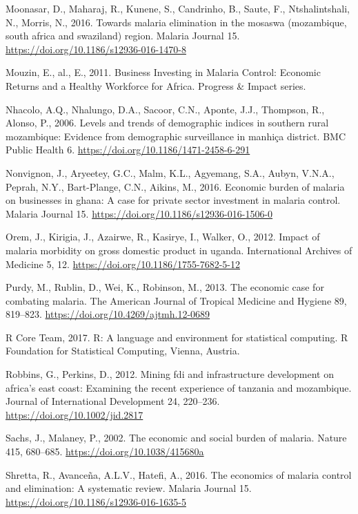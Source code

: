 \documentclass[]{article}
\begin{document}
\hypertarget{ref-Moonasar_2016}{}
Moonasar, D., Maharaj, R., Kunene, S., Candrinho, B., Saute, F.,
Ntshalintshali, N., Morris, N., 2016. Towards malaria elimination in the
mosaswa (mozambique, south africa and swaziland) region. Malaria Journal
15. \url{https://doi.org/10.1186/s12936-016-1470-8}

\hypertarget{ref-Mouzin2011}{}
Mouzin, E., al., E., 2011. Business Investing in Malaria Control:
Economic Returns and a Healthy Workforce for Africa. Progress \& Impact
series.

\hypertarget{ref-Nhacolo_2006}{}
Nhacolo, A.Q., Nhalungo, D.A., Sacoor, C.N., Aponte, J.J., Thompson, R.,
Alonso, P., 2006. Levels and trends of demographic indices in southern
rural mozambique: Evidence from demographic surveillance in manhiça
district. BMC Public Health 6.
\url{https://doi.org/10.1186/1471-2458-6-291}

\hypertarget{ref-Nonvignon_2016}{}
Nonvignon, J., Aryeetey, G.C., Malm, K.L., Agyemang, S.A., Aubyn,
V.N.A., Peprah, N.Y., Bart-Plange, C.N., Aikins, M., 2016. Economic
burden of malaria on businesses in ghana: A case for private sector
investment in malaria control. Malaria Journal 15.
\url{https://doi.org/10.1186/s12936-016-1506-0}

\hypertarget{ref-Orem_2012}{}
Orem, J., Kirigia, J., Azairwe, R., Kasirye, I., Walker, O., 2012.
Impact of malaria morbidity on gross domestic product in uganda.
International Archives of Medicine 5, 12.
\url{https://doi.org/10.1186/1755-7682-5-12}

\hypertarget{ref-Purdy_2013}{}
Purdy, M., Rublin, D., Wei, K., Robinson, M., 2013. The economic case
for combating malaria. The American Journal of Tropical Medicine and
Hygiene 89, 819--823. \url{https://doi.org/10.4269/ajtmh.12-0689}

\hypertarget{ref-R}{}
R Core Team, 2017. R: A language and environment for statistical
computing. R Foundation for Statistical Computing, Vienna, Austria.

\hypertarget{ref-Robbins2012}{}
Robbins, G., Perkins, D., 2012. Mining fdi and infrastructure
development on africa's east coast: Examining the recent experience of
tanzania and mozambique. Journal of International Development 24,
220--236. \url{https://doi.org/10.1002/jid.2817}

\hypertarget{ref-Sachs2002}{}
Sachs, J., Malaney, P., 2002. The economic and social burden of malaria.
Nature 415, 680--685. \url{https://doi.org/10.1038/415680a}

\hypertarget{ref-Shretta2016}{}
Shretta, R., Avanceña, A.L.V., Hatefi, A., 2016. The economics of
malaria control and elimination: A systematic review. Malaria Journal
15. \url{https://doi.org/10.1186/s12936-016-1635-5}
\end{document}
